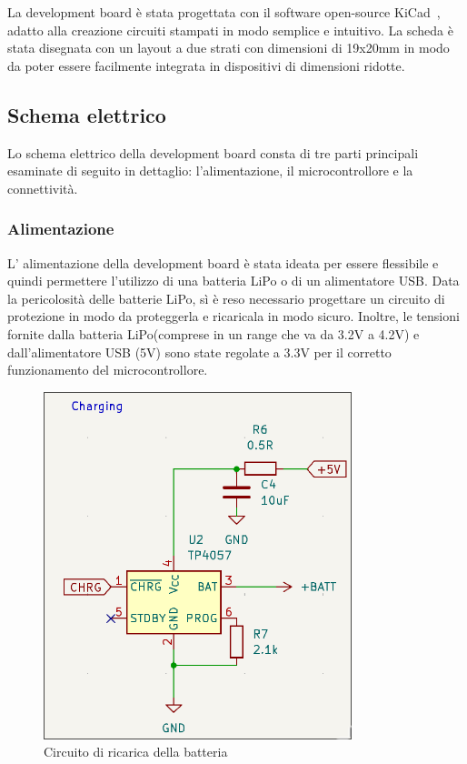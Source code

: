 La development board è stata progettata con il software open-source KiCad~\cite{kicad_website}, adatto alla creazione circuiti stampati in modo semplice e intuitivo.
La scheda è stata disegnata con un layout a due strati con dimensioni di 19x20mm in modo da poter essere facilmente integrata in dispositivi di dimensioni ridotte.

\subsection{Schema elettrico}

Lo schema elettrico della development board consta di tre parti principali esaminate di seguito in dettaglio: l'alimentazione, il microcontrollore e la connettività.

\subsubsection{Alimentazione}

L' alimentazione della development board è stata ideata per essere flessibile e quindi permettere l'utilizzo di una batteria LiPo o di un alimentatore USB.
Data la pericolosità delle batterie LiPo, sì è reso necessario progettare un circuito di protezione in modo da proteggerla e ricaricala in modo sicuro.
Inoltre, le tensioni fornite dalla batteria LiPo(comprese in un range che va da 3.2V a 4.2V) e dall'alimentatore USB (5V) 
sono state regolate a 3.3V per il corretto funzionamento del microcontrollore.

\begin{figure}[H]
  \centering
  \includegraphics[width=0.8\textwidth]{images/chapter2/charging.png}
  \caption{Circuito di ricarica della batteria}
  \label{fig:charging}
\end{figure}

